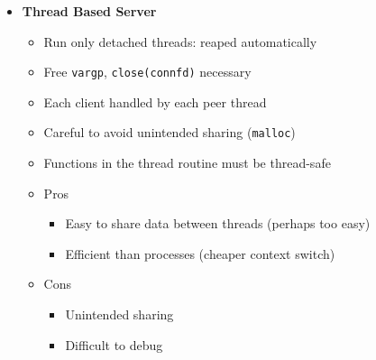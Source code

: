 \documentclass[12pt]{article}
\begin{document}
{\begin{itemize}
\begin{itemize}
\begin{itemize}
			\item \texttt{arg}: arguments for \texttt{f}
		\end{itemize}
		\item Terminating Threads
		\begin{itemize}
			\item \texttt{void pthread\_exit(void *thread\_return);}
			\item \texttt{int pthread\_cancel(pthread\_t tid);}
			\item Terminates the thread with \texttt{tid}
		\end{itemize}
		\item Reaping Threads
		\begin{itemize}
			\item \texttt{int pthread\_join(pthread\_t tid, void **thread\_return);}
			\item Blocks until thread \texttt{tid} terminates, and reaps terminated thread
			\item Can only wait for a specific thread
		\end{itemize}
		\item Detaching Threads
		\begin{itemize}
			\item Joinable thread: Can be reaped and killed by other threads, memory is not freed until reaped.
			\item Detached thread: Cannot be reaped by other threads, memory is freed automatically on termination
			\item \texttt{int pthread\_detach(pthread\_t tid);}
		\end{itemize}
	\end{itemize}
	\item \textbf{Thread Based Server}
	\begin{itemize}
		\item Run only detached threads: reaped automatically
		\item Free \texttt{vargp}, \texttt{close(connfd)} necessary
		\item Each client handled by each peer thread
		\item Careful to avoid unintended sharing (\texttt{malloc})
		\item Functions in the thread routine must be thread-safe
		\item Pros
		\begin{itemize}
			\item Easy to share data between threads (perhaps too easy)
			\item Efficient than processes (cheaper context switch)
		\end{itemize}
		\item Cons
		\begin{itemize}
			\item Unintended sharing
			\item Difficult to debug
		\end{itemize}
	\end{itemize}
\end{itemize}
\pagebreak

}
\end{document}
